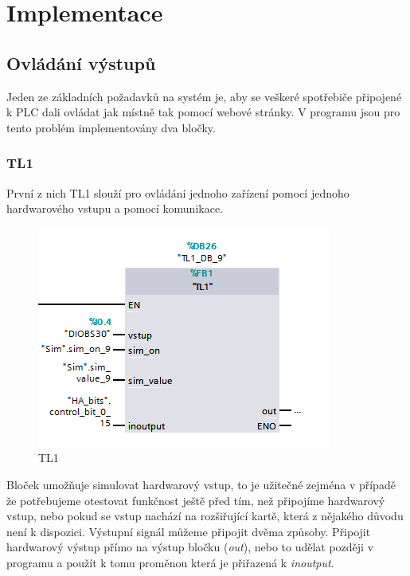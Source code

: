 \documentclass[a4paper,12pt,czech,bibliography=totoc]{scrbook}
\begin{document}
\chapter{Implementace}
\section{Ovládání výstupů}

	Jeden ze základních požadavků na systém je, aby se veškeré spotřebiče připojené k PLC dali ovládat jak místně tak pomocí webové stránky. V programu jsou pro tento problém implementovány dva bločky.
	\newline
	\subsection{TL1}
		První z nich TL1 slouží pro ovládání jednoho zařízení pomocí jednoho hardwarového vstupu a pomocí komunikace.
	\begin{figure}[h]
		\centering
		\includegraphics[scale = 1]{TL1.PNG}
		\caption{TL1}
		\label{fig:my_label}
	\end{figure}
\newline
Bloček umožňuje simulovat hardwarový vstup, to je užitečné zejména v případě že potřebujeme otestovat funkčnost ještě před tím, než připojíme hardwarový vstup, nebo pokud se vstup nachází na rozšiřující kartě, která z nějakého důvodu není k dispozici.
\newline
Výstupní signál můžeme připojit dvěma způsoby. Připojit hardwarový výstup přímo na výstup bločku (\textit{out}), nebo to udělat později v programu a použít k tomu proměnou která je přiřazená k \textit{inoutput}.
\end{document}
